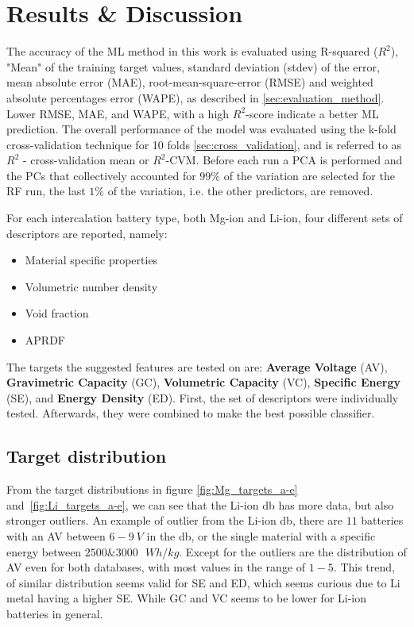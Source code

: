 \section{Results \& Discussion}

The accuracy of the ML method in this work is evaluated using R-squared ($R^2$), "Mean" of the training target values, standard deviation (stdev) of the error, mean absolute error (MAE), root-mean-square-error (RMSE) and weighted absolute percentages error (WAPE), as described in \ref{sec:evaluation_method}. Lower RMSE, MAE, and WAPE, with a high $R^2$-score indicate a better ML prediction. The overall performance of the model was evaluated using the k-fold cross-validation technique for 10 folds \ref{sec:cross_validation}, and is referred to as $R^2$ - cross-validation mean or $R^2$-CVM.
Before each run a PCA is performed and the PCs that collectively accounted for $99\%$ of the variation are selected for the RF run, the last $1\%$ of the variation, i.e. the other predictors, are removed.

For each intercalation battery type, both Mg-ion and Li-ion, four different sets of descriptors are reported, namely:

\begin{itemize}
\item Material specific properties
\item Volumetric number density 
\item Void fraction
\item APRDF
\end{itemize}


The targets the suggested features are tested on are: \textbf{Average Voltage} (\ac{AV}), \textbf{Gravimetric Capacity} (\ac{GC}), \textbf{Volumetric Capacity} (\ac{VC}), \textbf{Specific Energy} (\ac{SE}), and \textbf{Energy Density} (\ac{ED}). First, the set of descriptors were individually tested. Afterwards, they were combined to make the best possible classifier.

\subsection{Target distribution}

From the target distributions in figure \ref{fig:Mg_targets_a-e} and \ref{fig:Li_targets_a-e}, we can see that the Li-ion db has more data, but also stronger outliers. An example of outlier from the Li-ion db, there are $11$ batteries with an AV between $6-\SI{9}{V}$ in the db, or the single material with a specific energy between $2500 \& 3000 \text{ } \si{Wh/kg}$. Except for the outliers are the distribution of AV even for both databases, with most values in the range of $1-5$. This trend, of similar distribution seems valid for SE and ED, which seems curious due to Li metal having a higher SE. While GC and VC seems to be lower for Li-ion batteries in general. 

